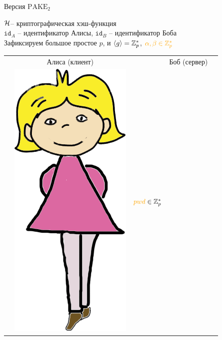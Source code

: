\documentclass[usenames,dvipsnames,8pt,aspectratio=169]{beamer}
\begin{document}
\begin{frame}{ Версия $\text{PAKE}_2$}
\Large
\vspace{-20pt}
\begin{center}
$\mathcal{H}$-- криптографическая хэш-функция  \\[3pt]
$\mathtt{id}_{A}$ -- идентификатор Алисы, $\mathtt{id}_{B}$ -- идентификатор Боба\\[3pt]
Зафиксируем большое простое $p$, и $\langle g \rangle = {{\mathbb Z}}_p^\ast$, $\color{Orange} \alpha, \beta \in \Zp^\ast $\\
\large 
\begin{center}
\begin{tabular}{l c c c l}
& Алиса (клиент)  & & Боб (сервер) &  \\
& \multirow{2}{*}{\includegraphics[scale=0.15]{Alice}} & { ${\color{Orange}pwd} \in \Zp^\ast $} &  \hspace{-20pt}

\end{tabular}
\end{center}
\end{center}
\end{frame}
\end{document}
